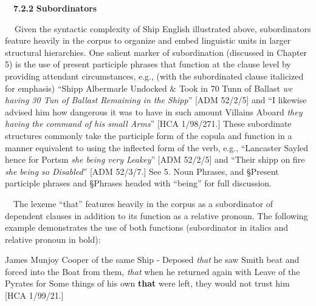 \begin{styleStandard}
\ \ \textbf{7.2.2} \textbf{Subordinators}
\end{styleStandard}

\begin{styleStandard}
\textbf{\ \ }Given the syntactic complexity of Ship English illustrated above, subordinators feature heavily in the corpus to organize and embed linguistic units in larger structural hierarchies. One salient marker of subordination (discussed in Chapter 5) is the use of present participle phrases that function at the clause level by providing attendant circumstances, e.g., (with the subordinated clause italicized for emphasis) “Shipp Albermarle Undocked \& Took in 70 Tunn of Ballast \textit{we having 30 Tun of Ballast Remaining in the Shipp}” [ADM 52/2/5] and “I likewise advised him how dangerous it was to have in such amount Villains Aboard \textit{they having the command of his small Arms}” [HCA 1/98/271.] These subordinate structures commonly take the participle form of the copula and function in a manner equivalent to using the inflected form of the verb, e.g., “Lancaster Sayled hence for Portsm \textit{she being very Leakey}” [ADM 52/2/5] and “Their shipp on fire \textit{she being so Disabled}” [ADM 52/3/7.] See 5. Noun Phrases, and §Present participle phrases and §Phrases headed with “being” for full discussion.
\end{styleStandard}

\begin{styleStandard}
\ \ The lexeme “that” features heavily in the corpus as a subordinator of dependent clauses in addition to its function as a relative pronoun. The following example demonstrates the use of both functions (subordinator in italics and relative pronoun in bold):
\end{styleStandard}

\begin{styleStandard}
James Munjoy Cooper of the same Ship - Deposed \textit{that} he saw Smith beat and forced into the Boat from them, \textit{that} when he returned again with Leave of the Pyrates for Some things of his own \textbf{that} were left, they would not trust him [HCA 1/99/21.]
\end{styleStandard}

